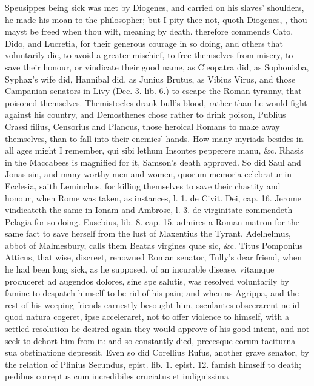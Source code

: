 Speusippes being sick was met by Diogenes, and carried on his slaves'
shoulders, he made his moan to the philosopher; but I pity thee not,
quoth Diogenes, , thou mayst be freed when
thou wilt, meaning by death. \Seneca{} therefore commends Cato,
Dido, and Lucretia, for their generous courage in so doing, and others
that voluntarily die, to avoid a greater mischief, to free themselves
from misery, to save their honour, or vindicate their good name, as
Cleopatra did, as Sophonisba, Syphax's wife did, Hannibal did, as
Junius Brutus, as Vibius Virus, and those Campanian senators in Livy
(Dec. 3. lib. 6.) to escape the Roman tyranny, that poisoned
themselves. Themistocles drank bull's blood, rather than he would fight
against his country, and Demosthenes chose rather to drink poison,
Publius Crassi filius, Censorius and Plancus, those heroical Romans to
make away themselves, than to fall into their enemies' hands. How many
myriads besides in all ages might I remember, qui sibi lethum Insontes
pepperere manu, \&c. Rhasis in the Maccabees is magnified for it,
Samson's death approved. So did Saul and Jonas sin, and many worthy men
and women, quorum memoria celebratur in Ecclesia, saith
Leminchus, for killing themselves to save their chastity and
honour, when Rome was taken, as \Austin instances, l. 1. de Civit. Dei,
cap. 16. Jerome vindicateth the same in Ionam and Ambrose, l. 3. de
virginitate commendeth Pelagia for so doing. Eusebius, lib. 8. cap. 15.
admires a Roman matron for the same fact to save herself from the lust
of Maxentius the Tyrant. Adelhelmus, abbot of Malmesbury, calls them
Beatas virgines quae sic, \&c. Titus Pomponius Atticus, that wise,
discreet, renowned Roman senator, Tully's dear friend, when he had been
long sick, as he supposed, of an incurable disease, vitamque produceret
ad augendos dolores, sine spe salutis, was resolved voluntarily by
famine to despatch himself to be rid of his pain; and when as Agrippa,
and the rest of his weeping friends earnestly besought him, osculantes
obsecrarent ne id quod natura cogeret, ipse acceleraret, not to offer
violence to himself, with a settled resolution he desired again they
would approve of his good intent, and not seek to dehort him from it:
and so constantly died, precesque eorum taciturna sua obstinatione
depressit. Even so did Corellius Rufus, another grave senator, by the
relation of Plinius Secundus, epist. lib. 1. epist. 12. famish himself
to death; pedibus correptus cum incredibiles cruciatus et indignissima
